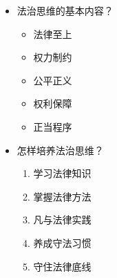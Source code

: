 \begin{itemize}
\tightlist
\item
  法治思维的基本内容？

  \begin{itemize}
  \tightlist
  \item
    法律至上
  \item
    权力制约
  \item
    公平正义
  \item
    权利保障
  \item
    正当程序
  \end{itemize}
\item
  怎样培养法治思维？

  \begin{enumerate}
  \def\labelenumi{\arabic{enumi}.}
  \tightlist
  \item
    学习法律知识
  \item
    掌握法律方法
  \item
    凡与法律实践
  \item
    养成守法习惯
  \item
    守住法律底线
  \end{enumerate}
\end{itemize}
